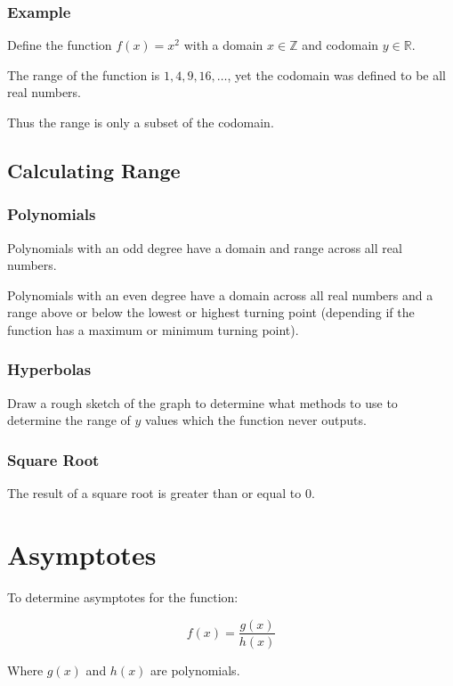 \documentclass[a4paper,11pt]{article}
\begin{document}
\subsubsection{Example}

Define the function $f(x) = x^2$ with a domain $x \in \mathbb{Z}$ and codomain
$y \in \mathbb{R}$.

The range of the function is ${1, 4, 9, 16, \ldots}$, yet the codomain was
defined to be all real numbers.

Thus the range is only a subset of the codomain.


\subsection{Calculating Range}

\subsubsection{Polynomials}

Polynomials with an odd degree have a domain and range across all real numbers.

Polynomials with an even degree have a domain across all real numbers and a
range above or below the lowest or highest turning point (depending if the
function has a maximum or minimum turning point).


\subsubsection{Hyperbolas}

Draw a rough sketch of the graph to determine what methods to use to determine
the range of $y$ values which the function never outputs.


\subsubsection{Square Root}

The result of a square root is greater than or equal to 0.




\section{Asymptotes}

To determine asymptotes for the function:

$$
f(x) = \frac{g(x)}{h(x)}
$$

Where $g(x)$ and $h(x)$ are polynomials.
\end{document}
